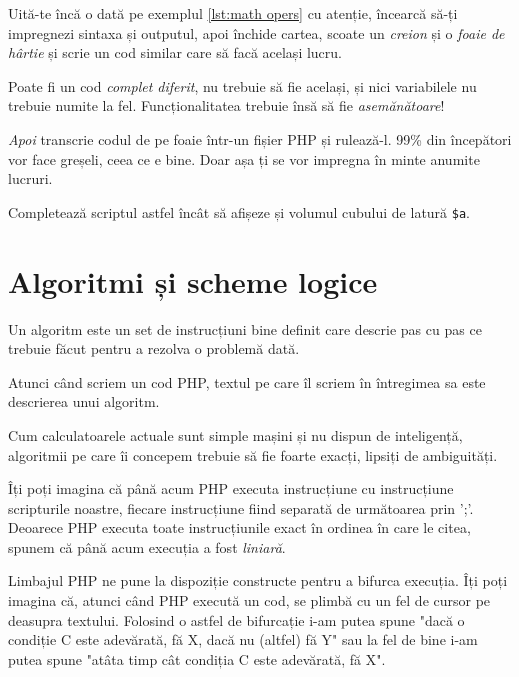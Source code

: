 \begin{Exercise}[difficulty=1,title={Primul pas spre creativitate}]
\ExePart
Uită-te încă o dată pe exemplul \ref{lst:math opers} cu atenție,
încearcă să-ți impregnezi sintaxa și outputul, apoi închide
cartea, scoate un \textit{creion} și o \textit{foaie de hârtie}
și scrie un cod similar care să facă același lucru.

Poate fi un cod \textit{complet diferit}, nu trebuie să fie același,
și nici variabilele nu trebuie numite la fel. Funcționalitatea
trebuie însă să fie \textit{asemănătoare}!

\textit{Apoi} transcrie codul de pe foaie într-un fișier
PHP și rulează-l. 99\% din începători vor face greșeli,
ceea ce e bine. Doar așa ți se vor impregna în minte anumite lucruri.

\ExePart
Completează scriptul astfel încât să afișeze și volumul cubului
de latură \texttt{\$a}.
\end{Exercise}



\section{Algoritmi și scheme logice}
Un algoritm este un set de instrucțiuni bine definit
care descrie pas cu pas ce trebuie făcut pentru
a rezolva o problemă dată.

Atunci când scriem un cod PHP, textul pe care
îl scriem în întregimea sa este descrierea unui algoritm.

Cum calculatoarele actuale sunt simple mașini și nu
dispun de inteligență, algoritmii pe care îi concepem
trebuie să fie foarte exacți, lipsiți de ambiguități.

Îți poți imagina că până acum PHP executa instrucțiune
cu instrucțiune scripturile noastre, fiecare instrucțiune
fiind separată de următoarea prin ';'.
Deoarece PHP executa toate instrucțiunile exact în ordinea
în care le citea, spunem că până acum execuția a fost
\textit{liniară}.

Limbajul PHP ne pune la dispoziție constructe pentru a bifurca
execuția. Îți poți imagina că, atunci când PHP
execută un cod, se plimbă cu un fel de cursor
pe deasupra {\glqq}textului{\grqq}. Folosind o astfel de bifurcație
i-am putea spune "dacă o condiție C este adevărată, fă
X, dacă nu (altfel) fă Y" sau la fel de bine
i-am putea spune "atâta timp cât condiția C
este adevărată, fă X".

